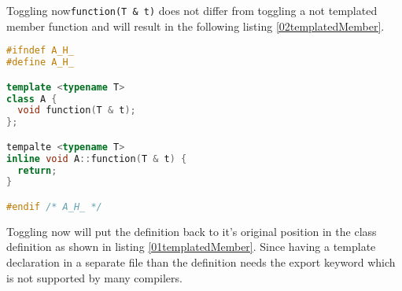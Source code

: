 Toggling now\texttt{function(T \& t)} does not differ from toggling a not
templated member function and will result in the following listing
\ref{02templatedMember}.

\begin{lstlisting}[caption={A.h, in header definition with template parameters},
label={02templatedMember}, language=C++]
#ifndef A_H_
#define A_H_

template <typename T>
class A {
  void function(T & t);
};

tempalte <typename T>
inline void A::function(T & t) {
  return;
}

#endif /* A_H_ */
\end{lstlisting}

Toggling now will put the definition back to it's original position in the
class definition as shown in listing \ref{01templatedMember}. Since having a
template declaration in a separate file than the definition needs the export
keyword which is not supported by many compilers.
